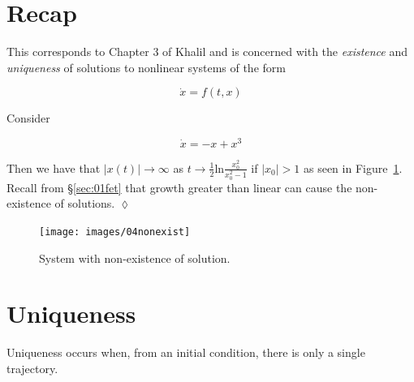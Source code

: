 \mainmatter%
\setcounter{page}{1}

\lectureseries[\course]{\course}

\date{January 14, 2010}

\setaddress%

\setcounter{lecture}{3}
\setcounter{chapter}{3}


\section{Recap}
This corresponds to Chapter 3 of Khalil and is concerned with the \textit{existence} and \textit{uniqueness} of solutions to nonlinear systems of the form

\begin{equation*}
\dot{x} = f(t,x)
\end{equation*}

\begin{example}
Consider

\begin{equation*}
\dot{x} = -x + x^3
\end{equation*}

Then we have that $|x(t)|\to\infty$ as $t\to\tfrac{1}{2}\text{ln}\frac{x_0^2}{x_0^2-1}$ if $|x_0|>1$ as seen in Figure~\ref{fig:04nonexist}.
Recall from \S\ref{sec:01fet} that growth greater than linear can cause the non-existence of solutions.
$\lozenge$
\end{example}

\begin{figure}[ht!]
\centering
\texttt{[image: images/04nonexist]}
\caption{System with non-existence of solution.}%
\label{fig:04nonexist}
\end{figure}

\section{Uniqueness}
Uniqueness occurs when, from an initial condition, there is only a single trajectory.

